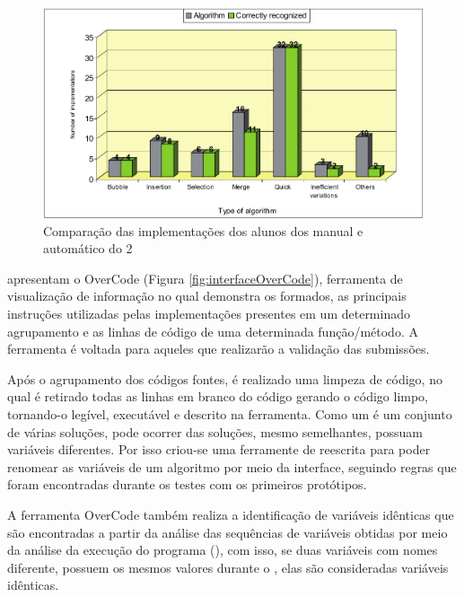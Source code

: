 	    \begin{figure}[ht]
	        \centering
	        \includegraphics[scale=0.33]{imagem/clusterAutomatico.png}
	        \captionsetup{justification=centering}
	        \caption{Comparação das implementações dos alunos dos 
	        	manual e automático do  2}
	        \label{fig:clusterAutomatico}
	    \end{figure}
	    
	     apresentam o OverCode (Figura \ref{fig:interfaceOverCode}),
	    ferramenta de visualização de informação no qual demonstra os  formados,
	    as principais instruções utilizadas pelas implementações presentes em um
	    determinado agrupamento e as linhas de código de uma determinada função/método.
	    A ferramenta é voltada para aqueles que realizarão a validação das submissões.
	    
	    Após o agrupamento dos códigos fontes, é realizado uma limpeza de código,
	    no qual é retirado todas as linhas em branco do código gerando o código limpo,
	    tornando-o legível, executável e descrito na ferramenta. Como um 
	    é um conjunto de várias soluções, pode ocorrer das soluções, mesmo semelhantes,
	    possuam variáveis diferentes. Por isso criou-se uma ferramente de reescrita
	    para poder renomear as variáveis de um algoritmo por meio da interface,
	    seguindo regras que foram encontradas durante os testes com os primeiros protótipos.
	    
	    A ferramenta OverCode também realiza a identificação de variáveis idênticas
	    que são encontradas a partir da análise das sequências de variáveis obtidas por meio
	    da análise da execução do programa (), com isso, se duas variáveis
	    com nomes diferente, possuem os mesmos valores durante o , elas são
	    consideradas variáveis idênticas.
	    
